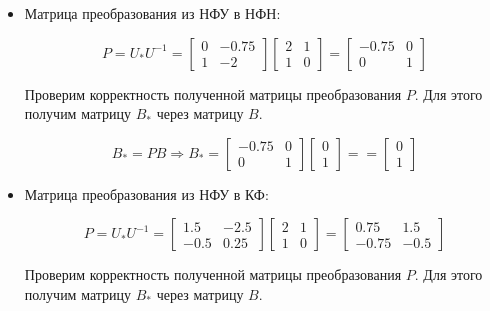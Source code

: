 \documentclass[14pt,a4paper,report]{report}
\begin{document}
\begin{itemize}
	\item Матрица преобразования из НФУ в НФН:
	
	\begin{equation*}
	\text{$P=U_{*}U^{-1}=\begin{bmatrix} 0 & -0.75 \\ 1 & -2 \end{bmatrix}\begin{bmatrix} 2 & 1 \\ 1 & 0 \end{bmatrix}=\begin{bmatrix} -0.75 & 0 \\ 0 & 1 \end{bmatrix}$}
	\end{equation*}
	
	Проверим корректность полученной матрицы преобразования $P$. Для этого получим матрицу $B_{*}$ через матрицу $B$. 
	
	\begin{equation*}
	\text{$B_{*}=PB$}
	\Longrightarrow
	\text{$B_{*}=\begin{bmatrix} -0.75 & 0 \\ 0 & 1 \end{bmatrix}\begin{bmatrix} 0 \\ 1 \end{bmatrix}==\begin{bmatrix} 0 \\ 1 \end{bmatrix}$}
	\end{equation*}
	
	\item Матрица преобразования из НФУ в КФ:
	
	\begin{equation*}
	\text{$P=U_{*}U^{-1}=\begin{bmatrix} 1.5 & -2.5 \\ -0.5 & 0.25 \end{bmatrix}\begin{bmatrix} 2 & 1 \\ 1 & 0 \end{bmatrix}=\begin{bmatrix} 0.75 & 1.5 \\ -0.75 & -0.5 \end{bmatrix}$}
	\end{equation*}
	
	Проверим корректность полученной матрицы преобразования $P$. Для этого получим матрицу $B_{*}$ через матрицу $B$. 
	

\end{itemize}
\end{document}
